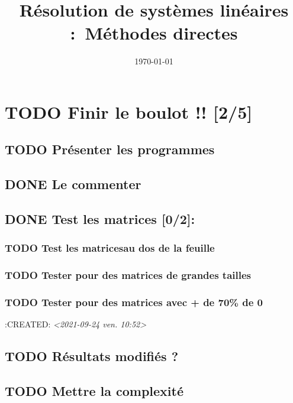 \documentclass[letter]{article}
\date{\today}
\title{Résolution de systèmes linéaires : Méthodes directes}
\begin{document}



\setcounter{tocdepth}{2}
\tableofcontents

\newpage




\section{{\bfseries\sffamily TODO} Finir le boulot !! [2/5]}
\label{sec:orgcff7cc2}
\subsection{{\bfseries\sffamily TODO} Présenter les programmes}
\label{sec:org6421796}
\subsection{{\bfseries\sffamily DONE} Le commenter}
\label{sec:orgbc2bf9d}
\subsection{{\bfseries\sffamily DONE} Test les matrices [0/2]:}
\label{sec:org8c9c332}
\subsubsection{{\bfseries\sffamily TODO} Test les matricesau dos de la feuille}
\label{sec:org5f9795d}
\subsubsection{{\bfseries\sffamily TODO} Tester pour des matrices de grandes tailles}
\label{sec:org3e0d7ad}
\subsubsection{{\bfseries\sffamily TODO} Tester pour des matrices avec + de 70\% de 0}
\label{sec:orge4fbfb6}
:CREATED:  \textit{<2021-09-24 ven. 10:52>}
\subsection{{\bfseries\sffamily TODO} Résultats modifiés ?}
\label{sec:org2eb7cd6}
\subsection{{\bfseries\sffamily TODO} Mettre la complexité}
\label{sec:org9b96aab}
\end{document}
